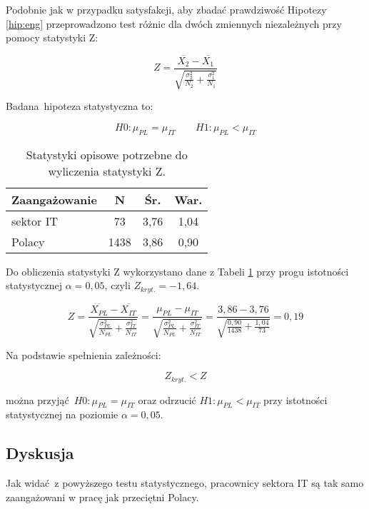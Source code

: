 Podobnie jak w przypadku satysfakcji, aby zbadać prawdziwość Hipotezy \ref{hip:eng} przeprowadzono test różnic dla dwóch zmiennych niezależnych przy pomocy statystyki Z:

\begin{equation}
  Z = \frac{\overline{X_2} - \overline{X_1}}{\sqrt{\frac{\sigma^2_2}{N_2}+\frac{\sigma^2_1}{N_1}}}
\end{equation}

Badana hipoteza statystyczna  to:

\begin{equation}
  H0: \mu_{PL} = \mu_{IT} \qquad H1: \mu_{PL} < \mu_{IT}
\end{equation}

\begin{table}[h!]
  \begin{center}
    \begin{tabular}{l | c c c }
      Zaangażowanie & N & Śr. & War. \\ \hline
      sektor IT & 73 & 3,76 & 1,04 \\
      Polacy & 1438 & 3,86 & 0,90 \\
    \end{tabular}
  \end{center}
  \caption{Statystyki opisowe potrzebne do wyliczenia statystyki Z.}
  \label{tab:uwes-norms-data}
\end{table}

Do obliczenia statystyki Z wykorzystano dane z Tabeli \ref{tab:uwes-norms-data} przy progu istotności statystycznej $\alpha = 0,05$, czyli $Z_{kryt.} = -1,64$.

\begin{equation}
  Z = \frac{\overline{X_{PL}} - \overline{X_{IT}}}{\sqrt{\frac{\sigma^2_{PL}}{N_{PL}}+\frac{\sigma^2_{IT}}{N_{IT}}}} = \frac{\mu_{PL} - \mu_{IT}}{\sqrt{\frac{\sigma^2_{PL}}{N_{PL}}+\frac{\sigma^2_{IT}}{N_{IT}}}} = \frac{3,86- 3,76}{\sqrt{\frac{0,90}{1438}+\frac{1,04}{73}}} = 0,19
\end{equation}

Na podstawie spełnienia zależności:

\begin{equation}
  Z_{kryt.} < Z
\end{equation}

można przyjąć $H0: \mu_{PL} = \mu_{IT}$ oraz odrzucić $H1: \mu_{PL} < \mu_{IT}$ przy istotności statystycznej na poziomie $\alpha = 0,05$.

\subsection{Dyskusja}
Jak widać z powyższego testu statystycznego, pracownicy sektora IT są tak samo zaangażowani w pracę jak przeciętni Polacy.

